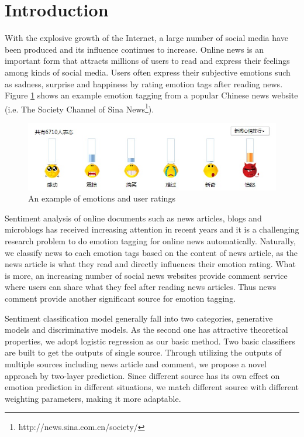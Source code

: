 \documentclass{IEEEtran}
\begin{document}
\section{Introduction}
With the explosive growth of the Internet, a large number of social media have been produced and its influence continues to increase. Online news is an important form that attracts millions of users to read and express their feelings among kinds of social media. Users often express their subjective emotions such as sadness, surprise and happiness by rating emotion tags after reading news. Figure \ref{figure:sinavotes} shows an example emotion tagging from a popular Chinese news website (i.e. The Society Channel of Sina News\footnote{http://news.sina.com.cn/society/}).
\vspace{-10pt}
\begin{figure} [!h]
\centering
\includegraphics[width=1\linewidth]{sinavotes.jpg}
\caption{An example of emotions and user ratings}
\label{figure:sinavotes}
\end{figure}

Sentiment analysis of online documents such as news articles, blogs and microblogs has received increasing attention in recent years and it is a challenging research problem to do emotion tagging for online news automatically. Naturally, we classify news to each emotion tags based on the content of news article, as the news article is what they read and directly influences their emotion rating. What is more, an increasing number of social news websites provide comment service where users can share what they feel after reading news articles. Thus news comment provide another significant source for emotion tagging.

Sentiment classification model generally fall into two categories, generative models and discriminative models. As the second one has attractive theoretical properties, we adopt logistic regression as our basic method. Two basic classifiers are built to get the outputs of single source. Through utilizing the outputs of multiple sources including news article and comment, we propose a novel approach by two-layer prediction. Since different source has its own effect on emotion prediction in different situations, we match different source with different weighting parameters, making it more adaptable.
\end{document}
